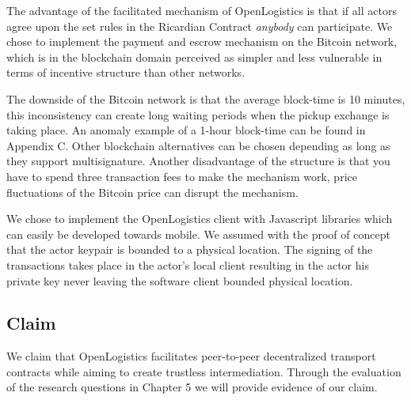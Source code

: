 The advantage of the facilitated mechanism of OpenLogistics is that if all actors agree upon the set rules in the Ricardian Contract \textit{anybody} can participate. We chose to implement the payment and escrow mechanism on the Bitcoin network, which is in the blockchain domain perceived as simpler and less vulnerable in terms of incentive structure than other networks. \par
The downside of the Bitcoin network is that the average block-time is 10 minutes, this inconsistency can create long waiting periods when the pickup exchange is taking place. An anomaly example of a 1-hour block-time can be found in Appendix C. Other blockchain alternatives can be chosen depending as long as they support multisignature. Another disadvantage of the structure is that you have to spend three transaction fees to make the mechanism work, price fluctuations of the Bitcoin price can disrupt the mechanism.\par
We chose to implement the OpenLogistics client with Javascript libraries which can easily be developed towards mobile. We assumed with the proof of concept that the actor keypair is bounded to a physical location. The signing of the transactions takes place in the actor's local client resulting in the actor his private key never leaving the software client bounded physical location.

\subsection{Claim}

We claim that OpenLogistics facilitates peer-to-peer decentralized transport contracts while aiming to create trustless intermediation. Through the evaluation of the research questions in Chapter 5 we will provide evidence of our claim.
